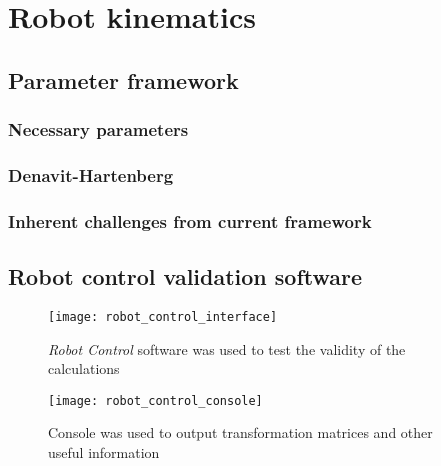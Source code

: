 \chapter{Robot kinematics}

\section{Parameter framework}
\lipsum[1]


\subsection{Necessary parameters}
\subsection{Denavit-Hartenberg}
\subsection{Inherent challenges from current framework}

\section{Robot control validation software}


\begin{figure}[h!]
    \centering
    \texttt{[image: robot\_control\_interface]}
    \caption{\textit{Robot Control} software was used to test the validity of the calculations}
\end{figure}

\begin{figure}[h!]
    \centering
    \texttt{[image: robot\_control\_console]}
    \caption{Console was used to output transformation matrices and other useful information}
\end{figure}

